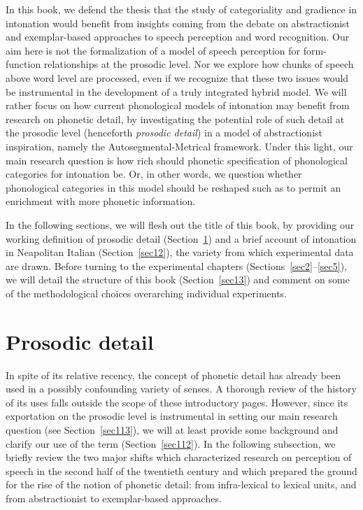 In this book, we defend the thesis that the study of categoriality and gradience in intonation would benefit from insights coming from the debate on abstractionist and exemplar-based approaches to speech perception and word recognition. Our aim here is not the formalization of a model of speech perception for form-function relationships at the prosodic level. Nor we explore how chunks of speech above word level are processed, even if we recognize that these two issues would be instrumental in the development of a truly integrated hybrid model. We will rather focus on how current phonological models of intonation may benefit from research on phonetic detail, by investigating the potential role of such detail at the prosodic level (henceforth \textit{prosodic detail}) in a model of abstractionist inspiration, namely the Autosegmental-Metrical framework. Under this light, our main research question is how rich should phonetic specification of phonological categories for intonation be. Or, in other words, we question whether phonological categories in this model should be reshaped such as to permit an enrichment with more phonetic information.

In the following sections, we will flesh out the title of this book, by providing our working definition of prosodic detail (Section~\ref{sec11}) and a brief account of intonation in Neapolitan Italian (Section~\ref{sec12}), the variety from which experimental data are drawn. Before turning to the experimental chapters (Sections~\ref{sec2}--\ref{sec5}), we will detail the structure of this book (Section~\ref{sec13}) and comment on some of the methodological choices overarching individual experiments.

\section{Prosodic detail}\label{sec11}
In spite of its relative recency, the concept of phonetic detail has already been used in a possibly confounding variety of senses. A thorough review of the history of its uses falls outside the scope of these introductory pages. However, since its exportation on the prosodic level is instrumental in setting our main research question (see Section~\ref{sec113}), we will at least provide some background and clarify our use of the term (Section~\ref{sec112}). In the following subsection, we briefly review the two major shifts which characterized research on perception of speech in the second half of the twentieth century and which prepared the ground for the rise of the notion of phonetic detail: from infra-lexical to lexical units, and from abstractionist to exemplar-based approaches.


